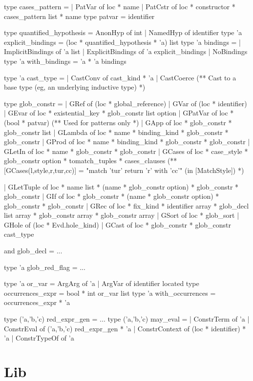 \documentclass[a4paper,oneside]{book}
\begin{document}
\begin{code}
type cases_pattern =
  | PatVar of loc * name
  | PatCstr of loc * constructor * cases_pattern list * name 
type patvar = identifier

type quantified_hypothesis = AnonHyp of int | NamedHyp of identifier
type 'a explicit_bindings = (loc * quantified_hypothesis * 'a) list
type 'a bindings =
  | ImplicitBindings of 'a list
  | ExplicitBindings of 'a explicit_bindings
  | NoBindings
type 'a with_bindings = 'a * 'a bindings

type 'a cast_type =
  | CastConv of cast_kind * 'a
  | CastCoerce (** Cast to a base type (eg, an underlying inductive type) *)

type glob_constr =
  | GRef of (loc * global_reference)
  | GVar of (loc * identifier)
  | GEvar of loc * existential_key * glob_constr list option
  | GPatVar of loc * (bool * patvar) (** Used for patterns only *)
  | GApp of loc * glob_constr * glob_constr list
  | GLambda of loc * name * binding_kind *  glob_constr * glob_constr
  | GProd of loc * name * binding_kind * glob_constr * glob_constr
  | GLetIn of loc * name * glob_constr * glob_constr
  | GCases of loc * case_style * glob_constr option * tomatch_tuples * cases_clauses
      (** [GCases(l,style,r,tur,cc)] = "match 'tur' return 'r' with 'cc'" (in 
	  [MatchStyle]) *)

  | GLetTuple of loc * name list * (name * glob_constr option) *
      glob_constr * glob_constr
  | GIf of loc * glob_constr * (name * glob_constr option) * glob_constr * glob_constr
  | GRec of loc * fix_kind * identifier array * glob_decl list array *
      glob_constr array * glob_constr array
  | GSort of loc * glob_sort
  | GHole of (loc * Evd.hole_kind)
  | GCast of loc * glob_constr * glob_constr cast_type

and glob_decl = ...

type 'a glob_red_flag = ...

type 'a or_var = ArgArg of 'a | ArgVar of identifier located
type occurrences_expr = bool * int or_var list
type 'a with_occurrences = occurrences_expr * 'a

type ('a,'b,'c) red_expr_gen = ...
type ('a,'b,'c) may_eval =
  | ConstrTerm of 'a
  | ConstrEval of ('a,'b,'c) red_expr_gen * 'a
  | ConstrContext of (loc * identifier) * 'a
  | ConstrTypeOf of 'a
\end{code}

\section{Lib}
\end{document}
